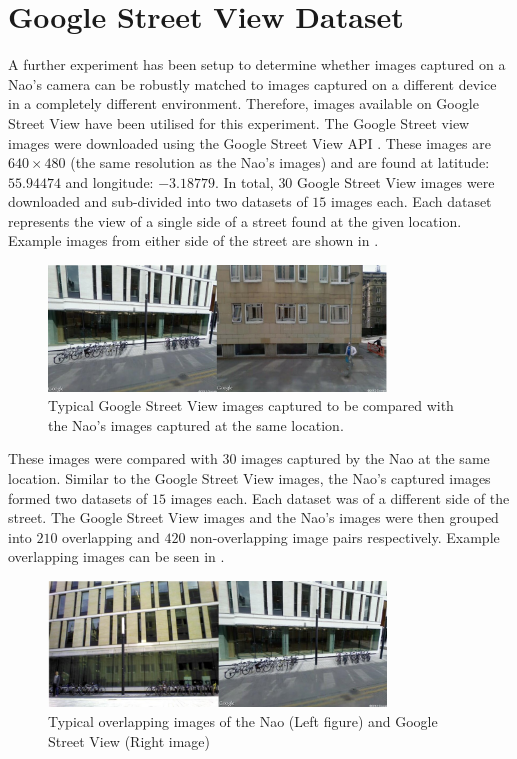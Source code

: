 \documentclass{report}
\begin{document}
\section{Google Street View Dataset}
\label{sec:streetView}
A further experiment has been setup to determine whether images captured on a Nao's camera can be robustly matched to images captured on a different device in a completely different environment. Therefore, images available on Google Street View have been utilised for this experiment. The Google Street view images were downloaded using the Google Street View API \cite{StreetView}. These images are $640 \times 480$ (the same resolution as the Nao's images) and are found at latitude: $55.94474$ and longitude: $-3.18779$. In total, $30$ Google Street View images were downloaded and sub-divided into two datasets of $15$ images each. Each dataset represents the view of a single side of a street found at the given location. Example images from either side of the street are shown in .\\

 \begin{figure}[h!] 
  \centering
    \includegraphics[width=0.8\textwidth]{../Drawings/streetView/googleStreetView.jpg}
    \caption{Typical Google Street View images captured to be compared with the Nao's images captured at the same location.}
    \label{fig:googleStreetImages}
\end{figure}

These images were compared with $30$ images captured by the Nao at the same location. Similar to the Google Street View images, the Nao's captured images formed two datasets of $15$ images each. Each dataset was of a different side of the street. The Google Street View images and the Nao's images were then grouped into $210$ overlapping and $420$ non-overlapping image pairs respectively. Example overlapping images can be seen in .\\

 \begin{figure}[h!] 
  \centering
    \includegraphics[width=0.8\textwidth]{../Drawings/streetView/googleOverlapping.jpg}
    \caption{Typical overlapping images of the Nao (Left figure) and Google Street View (Right image)}
    \label{fig:googleStreetImages}
\end{figure}
\end{document}
